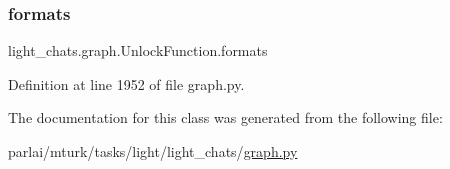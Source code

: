 \subsubsection{\texorpdfstring{formats}{formats}}
{\footnotesize\ttfamily light\+\_\+chats.\+graph.\+Unlock\+Function.\+formats}



Definition at line 1952 of file graph.\+py.



The documentation for this class was generated from the following file\+:\begin{DoxyCompactItemize}
\item 
parlai/mturk/tasks/light/light\+\_\+chats/\hyperlink{parlai_2mturk_2tasks_2light_2light__chats_2graph_8py}{graph.\+py}\end{DoxyCompactItemize}
